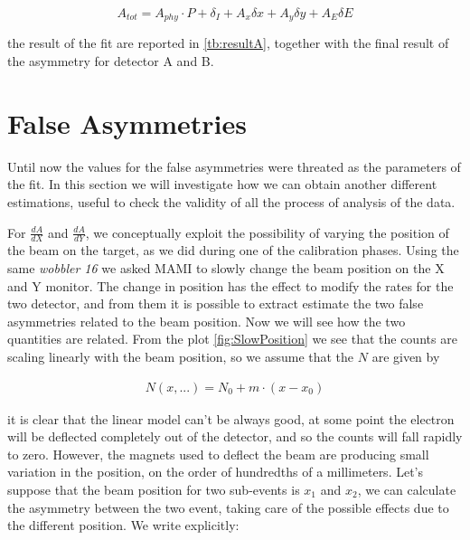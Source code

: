 \begin{equation} \label{eq:ModelloUsato}
A_{tot} = A_{phy} \cdot P + \delta_{I} + A_{x} \delta x + A_{y} \delta y + A_{E} \delta E 
\end{equation}


the result of the fit are reported in \ref{tb:resultA}, together with the final result of the asymmetry for detector A and B.

\section{False Asymmetries}

Until now the values for the false asymmetries were threated as the parameters of the fit. In this section we will investigate how we can obtain another different estimations, useful to check the validity of all the process of analysis of the data.

For $\frac{dA}{dX}$ and $\frac{dA}{dY}$, we conceptually exploit the possibility of varying the position of the beam on the target, as we did during one of the calibration phases. Using the same \textit{wobbler 16} we asked MAMI to slowly change the beam position on the X and Y monitor. The change in position has the effect to modify the rates for the two detector, and from them it is possible to extract estimate the two false asymmetries related to the beam position. Now we will see how the two quantities are related.
From the plot \ref{fig:SlowPosition} we see that the counts are scaling linearly with the beam position, so we assume that the $N$ are given by

\begin{align*}
N(x,...) = N_{0} + m \cdot (x - x_{0})
\end{align*}

it is clear that the linear model can't be always good, at some point the electron will be deflected completely out of the detector, and so the counts will fall rapidly to zero. However, the magnets used to deflect the beam are producing small variation in the position, on the order of hundredths of a millimeters.
Let's suppose that the beam position for two sub-events is $x_{1}$ and $x_{2}$, we can calculate the asymmetry between the two event, taking care of the possible effects due to the different position. We write explicitly: 

